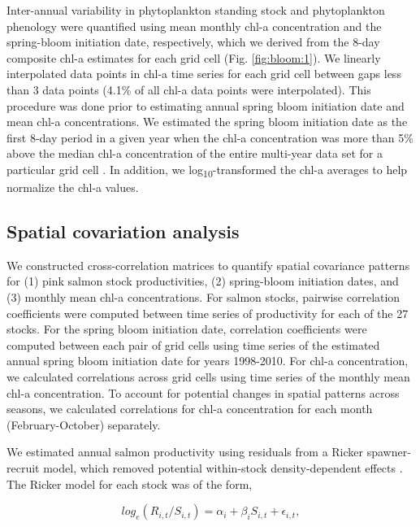 Inter-annual variability in phytoplankton standing stock and phytoplankton
phenology were quantified using mean monthly chl-a concentration and the
spring-bloom initiation date, respectively, which we derived from the 8-day
composite chl-a estimates for each grid cell (Fig. \ref{fig:bloom:1}). We linearly interpolated
data points in chl-a time series for each grid cell between gaps less than 3
data points (4.1\% of all chl-a data points were interpolated). This procedure
was done prior to estimating annual spring bloom initiation date and mean chl-a
concentrations. We estimated the spring bloom initiation date as the first 8-day
period in a given year when the chl-a concentration was more than 5\% above the
median chl-a concentration of the entire multi-year data set for a particular
grid cell \citep{Siegel2002a, Henson2007a}. In addition, we
log\textsubscript{10}-transformed the chl-a averages to help normalize the chl-a
values.


\subsection{Spatial covariation analysis}

We constructed cross-correlation matrices to quantify spatial covariance
patterns for (1) pink salmon stock productivities, (2) spring-bloom initiation
dates, and (3) monthly mean chl-a concentrations. For salmon stocks, pairwise
correlation coefficients were computed between time series of productivity for
each of the 27 stocks. For the spring bloom initiation date, correlation
coefficients were computed between each pair of grid cells using time series of
the estimated annual spring bloom initiation date for years 1998-2010. For chl-a
concentration, we calculated correlations across grid cells using time series of
the monthly mean chl-a concentration. To account for potential changes in
spatial patterns across seasons, we calculated correlations for chl-a
concentration for each month (February-October) separately.

We estimated annual salmon productivity using residuals from a Ricker
spawner-recruit model, which removed potential within-stock
density-dependent effects \citep{Pyper2001a, Mueter2002a, Ricker1954a}.
The Ricker model for each stock was of the form,

\begin{equation}
log_e(R_{i,t} / S_{i,t}) = \alpha_i + \beta_i S_{i,t} + \epsilon_{i,t},
\label{eq:bloom:1}
\end{equation}

